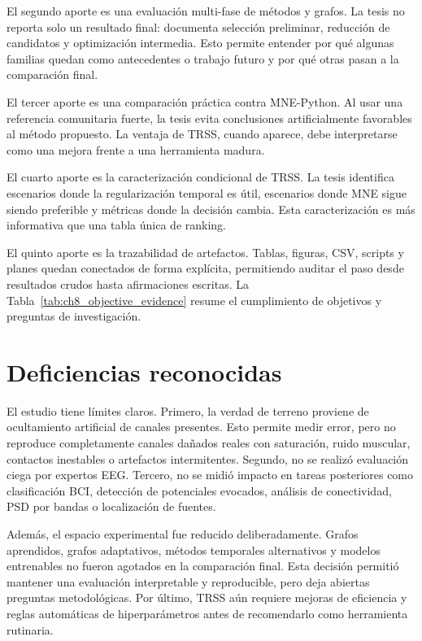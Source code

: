 El segundo aporte es una evaluación multi-fase de métodos y grafos. La tesis no reporta solo un resultado final: documenta selección preliminar, reducción de candidatos y optimización intermedia. Esto permite entender por qué algunas familias quedan como antecedentes o trabajo futuro y por qué otras pasan a la comparación final.

El tercer aporte es una comparación práctica contra MNE-Python. Al usar una referencia comunitaria fuerte, la tesis evita conclusiones artificialmente favorables al método propuesto. La ventaja de TRSS, cuando aparece, debe interpretarse como una mejora frente a una herramienta madura.

El cuarto aporte es la caracterización condicional de TRSS. La tesis identifica escenarios donde la regularización temporal es útil, escenarios donde MNE sigue siendo preferible y métricas donde la decisión cambia. Esta caracterización es más informativa que una tabla única de ranking.

El quinto aporte es la trazabilidad de artefactos. Tablas, figuras, CSV, scripts y planes quedan conectados de forma explícita, permitiendo auditar el paso desde resultados crudos hasta afirmaciones escritas. La Tabla~\ref{tab:ch8_objective_evidence} resume el cumplimiento de objetivos y preguntas de investigación.



\section{Deficiencias reconocidas}

El estudio tiene límites claros. Primero, la verdad de terreno proviene de ocultamiento artificial de canales presentes. Esto permite medir error, pero no reproduce completamente canales dañados reales con saturación, ruido muscular, contactos inestables o artefactos intermitentes. Segundo, no se realizó evaluación ciega por expertos EEG. Tercero, no se midió impacto en tareas posteriores como clasificación BCI, detección de potenciales evocados, análisis de conectividad, PSD por bandas o localización de fuentes.

Además, el espacio experimental fue reducido deliberadamente. Grafos aprendidos, grafos adaptativos, métodos temporales alternativos y modelos entrenables no fueron agotados en la comparación final. Esta decisión permitió mantener una evaluación interpretable y reproducible, pero deja abiertas preguntas metodológicas. Por último, TRSS aún requiere mejoras de eficiencia y reglas automáticas de hiperparámetros antes de recomendarlo como herramienta rutinaria.


